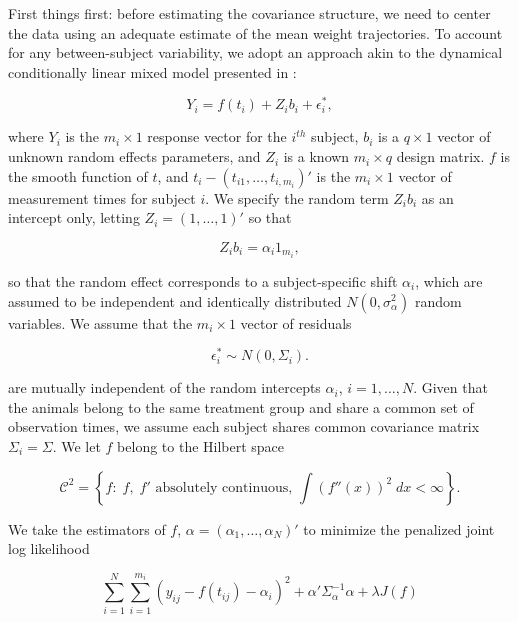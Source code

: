 \bigskip


First things first: before estimating the covariance structure, we need to center the data using an adequate estimate of the mean weight trajectories. To account for any between-subject variability, we adopt an approach akin to the dynamical conditionally linear mixed model presented in \cite{pourahmadi2002dynamic}:

\begin{equation}
Y_i = f\left(t_i  \right) + Z_i b_i + \epsilon^*_i,
\end{equation} 

\noindent
where $Y_i$ is the $m_i \times 1$ response vector for the $i^{th}$ subject, $b_i$ is a $q \times 1$ vector of unknown random effects parameters, and $Z_i$ is a known $m_i \times q$ design matrix.  $f$ is the smooth function of $t$, and $t_i - \left(t_{i1}, \dots, t_{i,m_i}\right)'$ is the $m_i \times 1$ vector of measurement times for subject $i$. We specify the random term $Z_i b_i$ as an intercept only, letting $Z_i = \left(1 , \dots, 1\right)'$ so that 

\[
 Z_i b_i = \alpha_i 1_{m_i}, 
\] 

\noindent
so that the random effect corresponds to a subject-specific shift $\alpha_i$, which are assumed to be independent and identically distributed $N\left(0,\sigma_\alpha^2\right)$ random variables. We assume that the $m_i \times 1$ vector of residuals

\[
\epsilon^*_i \sim N\left(0, \Sigma_i\right).
\] 

\noindent
are mutually independent of the random intercepts $\alpha_i$, $i = 1,\dots, N$. Given that the animals belong to the same treatment group and share a common set of observation times, we assume each subject shares common covariance matrix $\Sigma_i = \Sigma$. We let $f$ belong to the Hilbert space

\[
\mathcal{C}^2 = \left\{f: \; f,\;f' \mbox{ absolutely continuous, } \int\left(f''\left(x\right)\right)^2 \;dx < \infty  \right\}. 
\]

\noindent
We take the estimators of $f$, $\alpha = \left(\alpha_1,\dots, \alpha_N\right)'$ to minimize the penalized joint log likelihood

\begin{equation}
\sum_{i = 1}^N \sum_{i = 1}^{m_i} \left(y_{ij} - f\left(t_{ij} \right) - \alpha_i \right)^2 + \alpha' \Sigma_\alpha^{-1} \alpha + \lambda J \left(f\right)
\end{equation}

